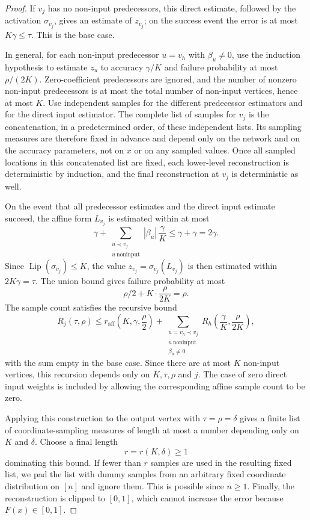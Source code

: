 \documentclass[11pt]{amsart}
\newcommand{\1}{\mathbf 1}
\newcommand{\Lip}{\operatorname{Lip}}
\begin{document}
\begin{proof}
If $v_j$ has no non-input predecessors, this direct estimate, followed by the activation $\sigma_{v_j}$, gives an estimate of $z_{v_j}$; on the success event the error is at most $K\gamma\leq\tau$.  This is the base case.

In general, for each non-input predecessor $u=v_h$ with $\beta_u\ne0$, use the induction hypothesis to estimate $z_u$ to accuracy $\gamma/K$ and failure probability at most $\rho/(2K)$.  Zero-coefficient predecessors are ignored, and the number of nonzero non-input predecessors is at most the total number of non-input vertices, hence at most $K$.  Use independent samples for the different predecessor estimators and for the direct input estimator.  The complete list of samples for $v_j$ is the concatenation, in a predetermined order, of these independent lists.  Its sampling measures are therefore fixed in advance and depend only on the network and on the accuracy parameters, not on $x$ or on any sampled values.  Once all sampled locations in this concatenated list are fixed, each lower-level reconstruction is deterministic by induction, and the final reconstruction at $v_j$ is deterministic as well.

On the event that all predecessor estimates and the direct input estimate succeed, the affine form $L_{v_j}$ is estimated within at most
\[
        \gamma+\sum_{\substack{u\prec v_j\\ u\ \mathrm{noninput}}}|\beta_u|\,\frac{\gamma}{K}
        \leq \gamma+\gamma=2\gamma .
\]
Since $\Lip(\sigma_{v_j})\leq K$, the value $z_{v_j}=\sigma_{v_j}(L_{v_j})$ is then estimated within $2K\gamma=\tau$.  The union bound gives failure probability at most
\[
        \rho/2+K\cdot\frac{\rho}{2K}=\rho .
\]
The sample count satisfies the recursive bound
\[
        R_j(\tau,\rho)
        \leq
        r_{\mathrm{aff}}\!\left(K,\gamma,\frac{\rho}{2}\right)
        +
        \sum_{\substack{u=v_h\prec v_j\\ u\ \mathrm{noninput}\\ \beta_u\ne0}}
        R_h\!\left(\frac{\gamma}{K},\frac{\rho}{2K}\right),
\]
with the sum empty in the base case.  Since there are at most $K$ non-input vertices, this recursion depends only on $K,\tau,\rho$ and $j$.  The case of zero direct input weights is included by allowing the corresponding affine sample count to be zero.

Applying this construction to the output vertex with $\tau=\rho=\delta$ gives a finite list of coordinate-sampling measures of length at most a number depending only on $K$ and $\delta$.  Choose a final length
\[
        r=r(K,\delta)\geq1
\]
dominating this bound.  If fewer than $r$ samples are used in the resulting fixed list, we pad the list with dummy samples from an arbitrary fixed coordinate distribution on $[n]$ and ignore them. This is possible since $n\geq1$.  Finally, the reconstruction is clipped to $[0,1]$, which cannot increase the error because $F(x)\in[0,1]$.
\end{proof}
\end{document}
